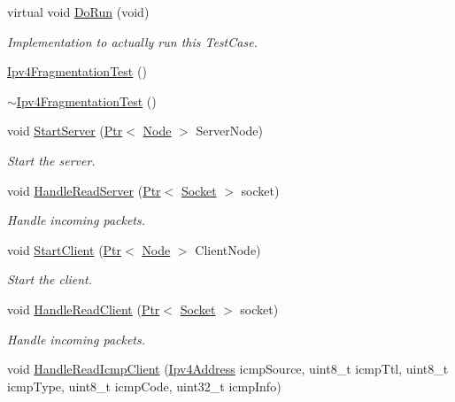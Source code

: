 \begin{DoxyCompactItemize}
\item 
virtual void \hyperlink{classIpv4FragmentationTest_abe15a9d41a354bd95bf8c0b1622a54cb}{Do\+Run} (void)
\begin{DoxyCompactList}\small\item\em Implementation to actually run this Test\+Case. \end{DoxyCompactList}\item 
\hyperlink{classIpv4FragmentationTest_a218a5125235ca9219716bda33eb7994f}{Ipv4\+Fragmentation\+Test} ()
\item 
\hyperlink{classIpv4FragmentationTest_ab78e808cd613878219af0c1aad592ff8}{$\sim$\+Ipv4\+Fragmentation\+Test} ()
\item 
void \hyperlink{classIpv4FragmentationTest_a854c6040ada33b3c61c03b459d1a1d72}{Start\+Server} (\hyperlink{classns3_1_1Ptr}{Ptr}$<$ \hyperlink{classns3_1_1Node}{Node} $>$ Server\+Node)
\begin{DoxyCompactList}\small\item\em Start the server. \end{DoxyCompactList}\item 
void \hyperlink{classIpv4FragmentationTest_ae96faa04d6aa0facdf1fbbabb1e3af01}{Handle\+Read\+Server} (\hyperlink{classns3_1_1Ptr}{Ptr}$<$ \hyperlink{classns3_1_1Socket}{Socket} $>$ socket)
\begin{DoxyCompactList}\small\item\em Handle incoming packets. \end{DoxyCompactList}\item 
void \hyperlink{classIpv4FragmentationTest_a5ce3759e72c31d2f86d6424ff0702b47}{Start\+Client} (\hyperlink{classns3_1_1Ptr}{Ptr}$<$ \hyperlink{classns3_1_1Node}{Node} $>$ Client\+Node)
\begin{DoxyCompactList}\small\item\em Start the client. \end{DoxyCompactList}\item 
void \hyperlink{classIpv4FragmentationTest_ad409cf6c22b25e40f02bd59be6c8350f}{Handle\+Read\+Client} (\hyperlink{classns3_1_1Ptr}{Ptr}$<$ \hyperlink{classns3_1_1Socket}{Socket} $>$ socket)
\begin{DoxyCompactList}\small\item\em Handle incoming packets. \end{DoxyCompactList}\item 
void \hyperlink{classIpv4FragmentationTest_a8f6da7f64518a34543b2e164a1b363a4}{Handle\+Read\+Icmp\+Client} (\hyperlink{classns3_1_1Ipv4Address}{Ipv4\+Address} icmp\+Source, uint8\+\_\+t icmp\+Ttl, uint8\+\_\+t icmp\+Type, uint8\+\_\+t icmp\+Code, uint32\+\_\+t icmp\+Info)

\end{DoxyCompactItemize}
